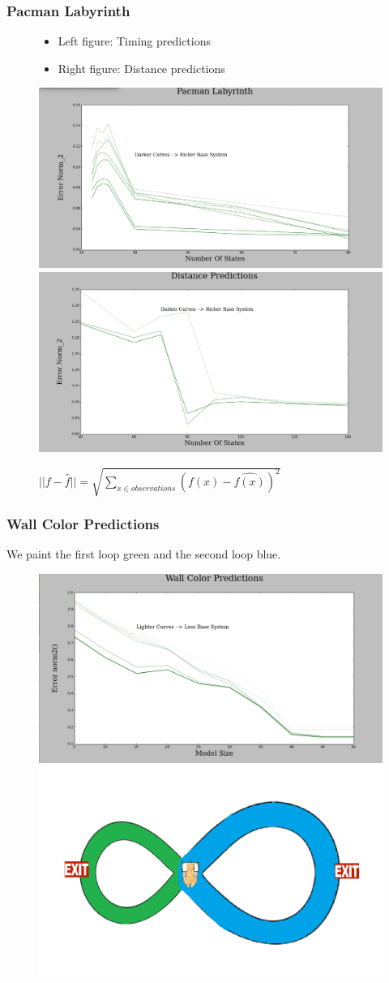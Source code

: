 \documentclass{beamer}
\begin{document}
\begin{frame}
\frametitle{Pacman Labyrinth}

\begin{figure}

\begin{itemize}
\item Left figure: Timing predictions
\item Right figure: Distance predictions

\end{itemize}

\includegraphics[width=0.45\linewidth]{lucasplots/monImages/PacmanLabyrinth.png}

\includegraphics[width=0.45\linewidth]{lucasplots/monImages/Distance_Predictions.png}

$||f - \hat{f}|| = \sqrt{\sum\nolimits_{x \in observations}(f(x) - \hat{f(x)})^2}$ 

\end{figure}
\end{frame}


\begin{frame}
\frametitle{Wall Color Predictions}
We paint the first loop green and the second loop blue.
\begin{figure}
\includegraphics[width=0.5\linewidth]{lucasplots/monImages/WallColorPredictions.png}
\includegraphics[width=0.5\linewidth]{lucasplots/monImages/doubleLoopImageMO.png}


\end{figure}
\end{frame}
\end{document}
